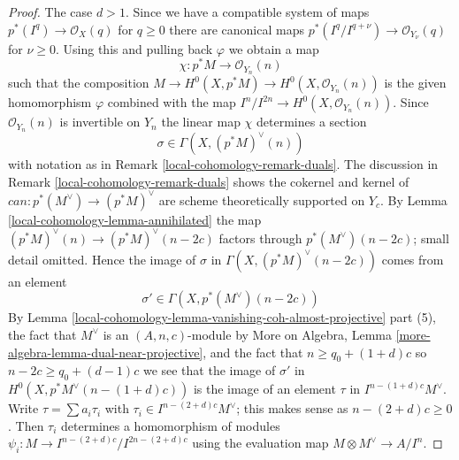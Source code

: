 \begin{proof}
The case $d > 1$. Since we have a compatible system of maps
$p^*(I^q) \to \mathcal{O}_X(q)$ for $q \geq 0$ there are canonical maps
$p^*(I^q/I^{q + \nu}) \to \mathcal{O}_{Y_\nu}(q)$ for $\nu \geq 0$.
Using this and pulling back $\varphi$ we obtain a map
$$
\chi : p^*M \longrightarrow \mathcal{O}_{Y_n}(n)
$$
such that the composition
$M \to H^0(X, p^*M) \to H^0(X, \mathcal{O}_{Y_n}(n))$
is the given homomorphism $\varphi$ combined with the
map $I^n/I^{2n} \to H^0(X, \mathcal{O}_{Y_n}(n))$.
Since $\mathcal{O}_{Y_n}(n)$ is invertible on $Y_n$ the
linear map $\chi$ determines a section
$$
\sigma \in \Gamma(X, (p^*M)^\vee(n))
$$
with notation as in Remark \ref{local-cohomology-remark-duals}.
The discussion in Remark \ref{local-cohomology-remark-duals} shows
the cokernel and kernel of $can : p^*(M^\vee) \to (p^*M)^\vee$
are scheme theoretically supported on $Y_c$. By
Lemma \ref{local-cohomology-lemma-annihilated} the map
$(p^*M)^\vee(n) \to (p^*M)^\vee(n - 2c)$ factors
through $p^*(M^\vee)(n - 2c)$; small detail omitted.
Hence the image of $\sigma$ in $\Gamma(X, (p^*M)^\vee(n - 2c))$
comes from an element
$$
\sigma' \in \Gamma(X, p^*(M^\vee)(n - 2c))
$$
By Lemma \ref{local-cohomology-lemma-vanishing-coh-almost-projective} part (5),
the fact that $M^\vee$ is an $(A, n, c)$-module by
More on Algebra, Lemma \ref{more-algebra-lemma-dual-near-projective},
and the fact that $n \geq q_0 + (1 + d)c$ so $n - 2c \geq q_0 + (d - 1)c$
we see that the image of $\sigma'$ in $H^0(X, p^*M^\vee(n - (1 + d)c))$
is the image of an element $\tau$ in $I^{n - (1 + d)c}M^\vee$.
Write $\tau = \sum a_i \tau_i$ with $\tau_i \in I^{n - (2 + d)c}M^\vee$;
this makes sense as $n - (2 + d)c \geq 0$.
Then $\tau_i$ determines a homomorphism of modules
$\psi_i : M \to I^{n - (2 + d)c}/I^{2n - (2 + d)c}$
using the evaluation map $M \otimes M^\vee \to A/I^n$.


\end{proof}
